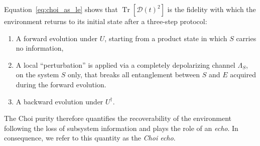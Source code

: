 \documentclass[pra,twocolumn,aps,showpacs,superscriptaddress,longbibliography]{revtex4-2}%
\providecommand{\DIFdelbegin}{} %
\begin{document}
Equation~\eqref{eq:choi_as_le} shows that $\operatorname{Tr}[\mathcal{D}(t)^2]$ is the fidelity with which the environment returns to its initial state after a three-step protocol:  
\begin{enumerate}
\item A forward evolution under $U$, starting from a product state in which $S$ carries no information,
\item A local ``perturbation'' is applied via a completely depolarizing channel $\Lambda_S$, on the system $S$ only, that breaks all entanglement between $S$ and $E$ acquired during the forward evolution.
\item A backward evolution under $U^\dagger$.
\end{enumerate}
The Choi purity therefore quantifies the recoverability of the environment following the loss of subsystem information and plays the role of an \textit{echo}. In consequence, we refer to this quantity as the \textit{Choi echo}.

\DIFdelbegin %

\end{document}
